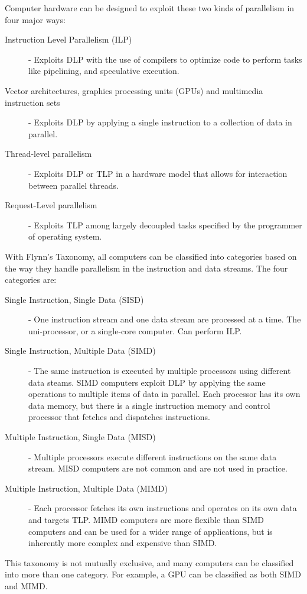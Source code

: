 \documentclass[12pt letter]{report}
\begin{document}
Computer hardware can be designed to exploit these two kinds of parallelism in four major ways:
\begin{description}
  \item[Instruction Level Parallelism (ILP)] - Exploits DLP with the use of compilers to optimize code to perform tasks
        like pipelining, and speculative execution.
  \item[Vector architectures, graphics processing units (GPUs) and multimedia instruction sets] - Exploits DLP by
        applying a single instruction to a collection of data in parallel.
  \item[Thread-level parallelism ] - Exploits DLP or TLP in a hardware model that allows for interaction between
        parallel threads.
  \item[Request-Level parallelism] - Exploits TLP among largely decoupled tasks specified by the programmer of operating
        system.
\end{description}

With Flynn's Taxonomy, all computers can be classified into categories based on the way they handle parallelism in the
instruction and data streams. The four categories are:
\begin{description}
  \item[Single Instruction, Single Data (SISD)]  - One instruction stream and one data stream are processed at a time. The uni-processor, or a single-core computer. Can perform ILP.
  \item[Single Instruction, Multiple Data (SIMD)] - The same instruction is executed by multiple processors using
        different data steams. SIMD computers exploit DLP by applying the same operations to multiple items of data in
        parallel. Each processor has its own data memory, but there is a single instruction memory and control processor
        that fetches and dispatches instructions.
  \item [Multiple Instruction, Single Data (MISD)] - Multiple processors execute different instructions on the same
        data stream. MISD computers are not common and are not used in practice.
  \item[Multiple Instruction, Multiple Data (MIMD)] - Each processor fetches its own instructions and operates on
        its own data and targets TLP. MIMD computers are more flexible than SIMD computers and can be used for a wider
        range of applications, but is inherently more complex and expensive than SIMD.
\end{description}
This taxonomy is not mutually exclusive, and many computers can be classified into more than one category. For example, a GPU can be classified as both SIMD and MIMD.
\end{document}
